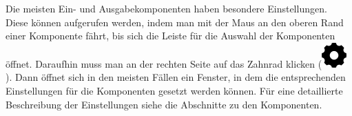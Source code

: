 Die meisten Ein- und Ausgabekomponenten haben besondere Einstellungen. Diese
können aufgerufen werden, indem man mit der Maus an den oberen Rand einer
Komponente fährt, bis sich die Leiste für die Auswahl der Komponenten öffnet.
Daraufhin muss man an der rechten Seite auf das Zahnrad klicken
(\includegraphics[scale=0.22]{Images/SettingsIcon}). Dann öffnet sich in den
meisten Fällen ein Fenster, in dem die entsprechenden Einstellungen für die
Komponenten gesetzt werden können. Für eine detaillierte Beschreibung der
Einstellungen siehe die Abschnitte zu den Komponenten.
